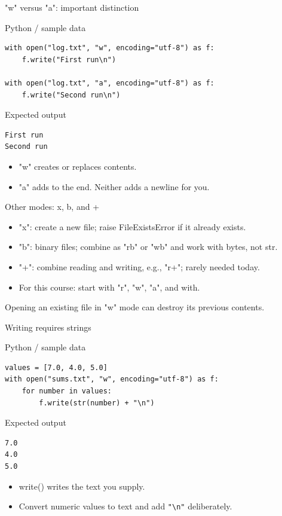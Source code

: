 \documentclass[aspectratio=169,10pt]{beamer}
\begin{document}
\begin{frame}[fragile]{"w" versus "a": important distinction}
\begin{block}{Python / sample data}\begin{Verbatim}[fontsize=\footnotesize]
with open("log.txt", "w", encoding="utf-8") as f:
    f.write("First run\n")

with open("log.txt", "a", encoding="utf-8") as f:
    f.write("Second run\n")
\end{Verbatim}
\end{block}
\vspace{-0.07in}\begin{block}{Expected output}\begin{Verbatim}[fontsize=\scriptsize]
First run
Second run
\end{Verbatim}
\end{block}
\small\begin{itemize}
\item "w" creates or replaces contents.
\item "a" adds to the end. Neither adds a newline for you.
\end{itemize}
\end{frame}
\begin{frame}[fragile]{Other modes: x, b, and +}
\begin{itemize}
\item "x": create a new file; raise FileExistsError if it already exists.
\item "b": binary files; combine as "rb" or "wb" and work with bytes, not str.
\item "+": combine reading and writing, e.g., "r+"; rarely needed today.
\item For this course: start with "r", "w", "a", and with.
\end{itemize}
\vspace{0.1in}\begin{keyidea}\small Opening an existing file in "w" mode can destroy its previous contents.\end{keyidea}
\end{frame}
\begin{frame}[fragile]{Writing requires strings}
\begin{block}{Python / sample data}\begin{Verbatim}[fontsize=\footnotesize]
values = [7.0, 4.0, 5.0]
with open("sums.txt", "w", encoding="utf-8") as f:
    for number in values:
        f.write(str(number) + "\n")
\end{Verbatim}
\end{block}
\vspace{-0.07in}\begin{block}{Expected output}\begin{Verbatim}[fontsize=\scriptsize]
7.0
4.0
5.0
\end{Verbatim}
\end{block}
\small\begin{itemize}
\item write() writes the text you supply.
\item Convert numeric values to text and add \texttt{"\textbackslash{}n"} deliberately.
\end{itemize}
\end{frame}
\end{document}
